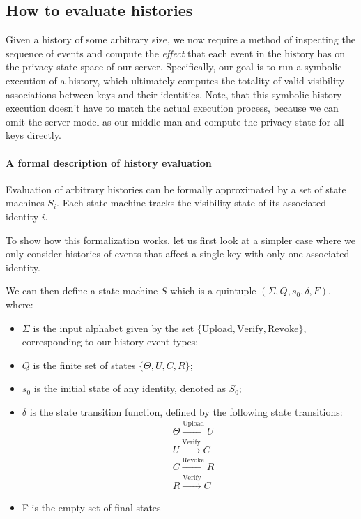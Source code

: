 \subsection{How to evaluate histories}
Given a history of some arbitrary size, we now require a method of inspecting the sequence of events and compute the \emph{effect} that each event in the history has on the privacy state space of our server. 
Specifically, our goal is to run a symbolic execution of a history, which ultimately computes the totality of valid visibility associations between keys and their identities. Note, that this symbolic history execution doesn't have to match the actual execution process, because we can omit the server model as our middle man and compute the privacy state for all keys directly.

\paragraph{A formal description of history evaluation}
\label{sec:history_def}

Evaluation of arbitrary histories can be formally approximated by a set of state machines \(S_i\). Each state machine tracks the visibility state of its associated identity \(i\).

To show how this formalization works, let us first look at a simpler case where we only consider histories of events that affect a single key with only one associated identity. 

We can then define a state machine \(S\) which is a quintuple \((\Sigma,Q,s_0,\delta,F)\), where:
\begin{itemize}
    \item \(\Sigma\) is the input alphabet given by the set \(\{\text{Upload},\text{Verify},\text{Revoke}\}\), corresponding to our history event types;
    \item \(Q\) is the finite set of states \(\{\Theta,U,C,R\}\);
    \item \(s_0\) is the initial state of any identity, denoted as \(S_0\);
    \item \(\delta\) is the state transition function, defined by the following state transitions:
    \begin{equation}
        \begin{aligned}
            &\Theta \xrightarrow{\text{Upload}}U \\
            &U \xrightarrow{\text{Verify}}C \\
            &C \xrightarrow{\text{Revoke}}R \\
            &R \xrightarrow{\text{Verify}}C
        \end{aligned}
    \end{equation}
    \item F is the empty set of final states
\end{itemize}

